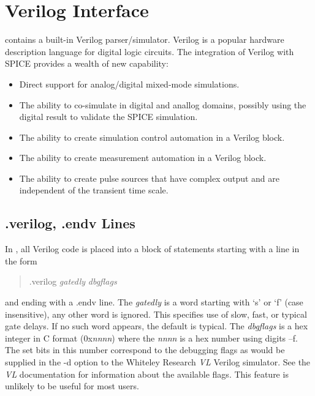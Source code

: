 \section{Verilog Interface}


{\WRspice} contains a built-in Verilog parser/simulator.  Verilog is a
popular hardware description language for digital logic circuits.  The
integration of Verilog with SPICE provides a wealth of new capability:
\begin{itemize}
\item{Direct support for analog/digital mixed-mode simulations.}

\item{The ability to co-simulate in digital and anallog domains,
possibly using the digital result to validate the SPICE simulation.}
\item{The ability to create simulation control automation in a
        Verilog block.}
\item{The ability to create measurement automation in a Verilog
        block.}
\item{The ability to create pulse sources that have complex output
        and are independent of the transient time scale.}
\end{itemize}

\subsection{{\vt .verilog}, {\vt .endv}  Lines}
In {\WRspice}, all Verilog code is placed into a block of statements
starting with a line in the form
\begin{quote}
{\vt .verilog} {\it gatedly} {\it dbgflags}
\end{quote}
and ending with a {\vt .endv} line.  The {\it gatedly} is a word
starting with `{\vt s}' or `{\vt f}' (case insensitive), any other
word is ignored.  This specifies use of slow, fast, or typical gate
delays.  If no such word appears, the default is typical.  The {\it
dbgflags} is a hex integer in C format ({\vt 0x}{\it nnnn\/}) where
the {\it nnnn} is a hex number using digits {}--{\vt f}.  The set
bits in this number correspond to the debugging flags as would be
supplied in the {\vt -d} option to the Whiteley Research {\it VL}
Verilog simulator.  See the {\it VL} documentation for information
about the available flags.  This feature is unlikely to be useful for
most users.

